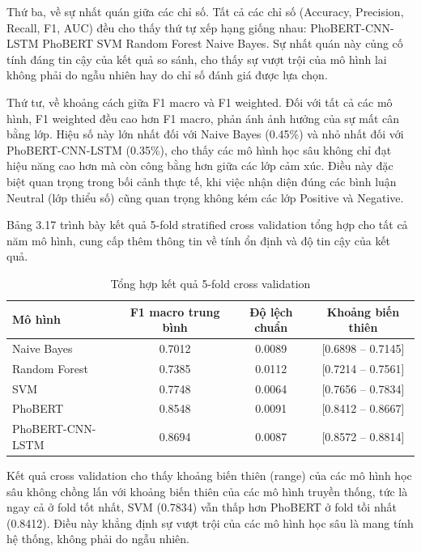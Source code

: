 \documentclass[14pt, a4paper]{report}
\begin{document}
Thứ ba, về sự nhất quán giữa các chỉ số. Tất cả các chỉ số (Accuracy, Precision, Recall, F1, AUC) đều cho thấy thứ tự xếp hạng giống nhau: PhoBERT-CNN-LSTM \> PhoBERT \> SVM \> Random Forest \> Naive Bayes. Sự nhất quán này củng cố tính đáng tin cậy của kết quả so sánh, cho thấy sự vượt trội của mô hình lai không phải do ngẫu nhiên hay do chỉ số đánh giá được lựa chọn.


Thứ tư, về khoảng cách giữa F1 macro và F1 weighted. Đối với tất cả các mô hình, F1 weighted đều cao hơn F1 macro, phản ánh ảnh hưởng của sự mất cân bằng lớp. Hiệu số này lớn nhất đối với Naive Bayes (0.45\%) và nhỏ nhất đối với PhoBERT-CNN-LSTM (0.35\%), cho thấy các mô hình học sâu không chỉ đạt hiệu năng cao hơn mà còn công bằng hơn giữa các lớp cảm xúc. Điều này đặc biệt quan trọng trong bối cảnh thực tế, khi việc nhận diện đúng các bình luận Neutral (lớp thiểu số) cũng quan trọng không kém các lớp Positive và Negative.


Bảng 3.17 trình bày kết quả 5-fold stratified cross validation tổng hợp cho tất cả năm mô hình, cung cấp thêm thông tin về tính ổn định và độ tin cậy của kết quả.


\begin{table}[h]
\centering
\caption{Tổng hợp kết quả 5-fold cross validation}
\begin{tabular}{|l|c|c|c|}
\hline
\textbf{Mô hình} & \textbf{F1 macro trung bình} & \textbf{Độ lệch chuẩn} & \textbf{Khoảng biến thiên} \\
\hline
Naive Bayes & 0.7012 & 0.0089 & [0.6898 -- 0.7145] \\
\hline
Random Forest & 0.7385 & 0.0112 & [0.7214 -- 0.7561] \\
\hline
SVM & 0.7748 & 0.0064 & [0.7656 -- 0.7834] \\
\hline
PhoBERT & 0.8548 & 0.0091 & [0.8412 -- 0.8667] \\
\hline
PhoBERT-CNN-LSTM & 0.8694 & 0.0087 & [0.8572 -- 0.8814] \\
\hline
\end{tabular}
\end{table}




Kết quả cross validation cho thấy khoảng biến thiên (range) của các mô hình học sâu không chồng lấn với khoảng biến thiên của các mô hình truyền thống, tức là ngay cả ở fold tốt nhất, SVM (0.7834) vẫn thấp hơn PhoBERT ở fold tồi nhất (0.8412). Điều này khẳng định sự vượt trội của các mô hình học sâu là mang tính hệ thống, không phải do ngẫu nhiên.
\end{document}
